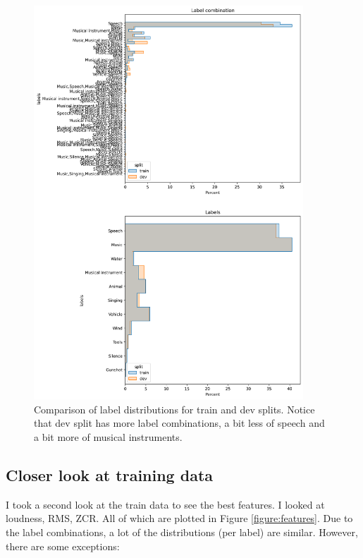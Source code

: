 \documentclass[11pt]{article}
\begin{document}
\begin{figure}

  \centering
  \includegraphics[width=0.9\textwidth]{../notebooks/imgs/dev_train_distributions.png}

  \caption{Comparison of label distributions for train and dev splits. Notice
  that dev split has more label combinations, a bit less of speech and a bit
  more of musical instruments.}\label{fig:label_distributions}

\end{figure}

\subsection{Closer look at training data}\label{section:train_data}

I took a second look at the train data to see the best features. I looked at
loudness, RMS, ZCR. All of which are plotted in Figure \ref{figure:features}. Due to
the label combinations, a lot of the distributions (per label) are similar.
However, there are some exceptions:
\end{document}
